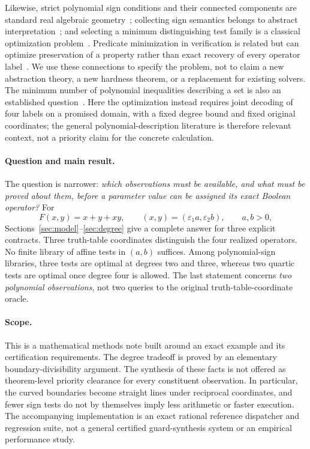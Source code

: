 \documentclass[11pt]{article}
\theoremstyle{definition}
\theoremstyle{remark}
\newcommand{\eps}{\varepsilon}
\begin{document}
Likewise, strict polynomial sign conditions and their connected components are standard real algebraic geometry~\cite{BPR2006,BPR2009,JPS2010}; collecting sign semantics belongs to abstract interpretation~\cite{Cousot1977}; and selecting a minimum distinguishing test family is a classical optimization problem~\cite{Moret1985,Berman2005}. Predicate minimization in verification is related but can optimize preservation of a property rather than exact recovery of every operator label~\cite{Chaki2003}. We use these connections to specify the problem, not to claim a new abstraction theory, a new hardness theorem, or a replacement for existing solvers. The minimum number of polynomial inequalities describing a set is also an established question~\cite{Averkov2010}. Here the optimization instead requires joint decoding of four labels on a promised domain, with a fixed degree bound and fixed original coordinates; the general polynomial-description literature is therefore relevant context, not a priority claim for the concrete calculation.

\paragraph{Question and main result.}
The question is narrower: \emph{which observations must be available, and what must be proved about them, before a parameter value can be assigned its exact Boolean operator?} For
\[
 F(x,y)=x+y+xy,\qquad (x,y)=(\eps_1 a,\eps_2 b),\qquad a,b>0,
\]
Sections~\ref{sec:model}--\ref{sec:degree} give a complete answer for three explicit contracts. Three truth-table coordinates distinguish the four realized operators. No finite library of affine tests in $(a,b)$ suffices. Among polynomial-sign libraries, three tests are optimal at degrees two and three, whereas two quartic tests are optimal once degree four is allowed. The last statement concerns \emph{two polynomial observations}, not two queries to the original truth-table-coordinate oracle.

\paragraph{Scope.}
This is a mathematical methods note built around an exact example and its certification requirements. The degree tradeoff is proved by an elementary boundary-divisibility argument. The synthesis of these facts is not offered as theorem-level priority clearance for every constituent observation. In particular, the curved boundaries become straight lines under reciprocal coordinates, and fewer sign tests do not by themselves imply less arithmetic or faster execution. The accompanying implementation is an exact rational reference dispatcher and regression suite, not a general certified guard-synthesis system or an empirical performance study.
\end{document}
